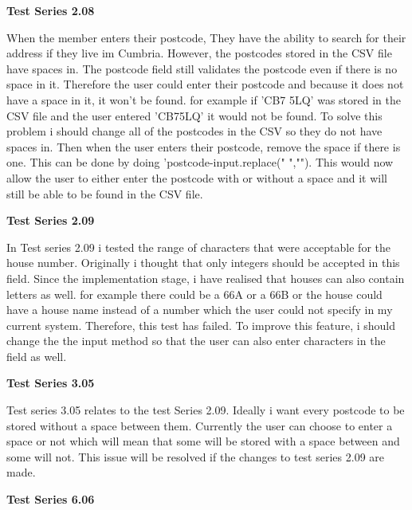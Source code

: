 \textbf{Test Series 2.08}

When the member enters their postcode, They have the ability to search for their address if they live im Cumbria. However, the postcodes stored in the CSV file have spaces in. The postcode field still validates the postcode even if there is no space in it. Therefore the user could enter their postcode and because it does not have a space in it, it won't be found. for example if 'CB7 5LQ' was stored in the CSV file and the user entered 'CB75LQ' it would not be found. To solve this problem i should change all of the postcodes in the CSV so they do not have spaces in. Then when the user enters their postcode, remove the space if there is one. This can be done by doing 'postcode-input.replace(" ",""). This would now allow the user to either enter the postcode with or without a space and it will still be able to be found in the CSV file.

\textbf{Test Series 2.09}

In Test series 2.09 i tested the range of characters that were acceptable for the house number. Originally i thought that only integers should be accepted in this field. Since the implementation stage, i have realised that houses can also contain letters as well. for example there could be a 66A or a 66B or the house could have a house name instead of a number which the user could not specify in my current system. Therefore,  this test has failed. To improve this feature, i should change the the input method so that the user can also enter characters in the field as well.

\textbf{Test Series 3.05}

Test series 3.05 relates to the test Series 2.09. Ideally i want every postcode to be stored without a space between them. Currently the user can choose to enter a space or not which will mean that some will be stored with a space between and some will not. This issue will be resolved if the changes to test series 2.09 are made.

\textbf{Test Series 6.06}


